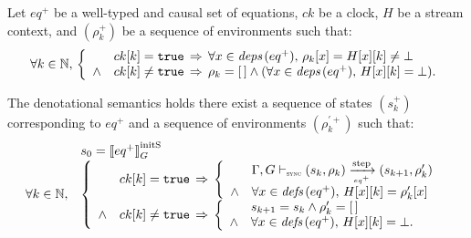 \begin{lemma}
    \label{lem:semantics:grsync:theorems:equivalence:eq}
    Let $eq^+$ be a well-typed and causal set of \GRSync equations, $ck$ be a clock, $H$ be a stream
    context, and $(\rho_k^+)$ be a sequence of environments such that:
    \begin{equation*}
        \forall k \in \mathbb{N}, \,
        \left\{
        \begin{array}{ll}
                   & ck[k] = \mathtt{{true}} \, \Rightarrow \,
            \forall x \in {\ensuremath{\textit{deps}\left(eq^+\right)}}, \, \rho_k[x] = H[x][k] \neq \bot               \\
            \wedge & ck[k] \neq \mathtt{{true}} \, \Rightarrow \,
            \rho_k = [\,] \wedge (\forall x \in {\ensuremath{\textit{deps}\left(eq^+\right)}}, \, H[x][k] = \bot). \\
        \end{array}
        \right.
    \end{equation*}

    The denotational semantics  holds \iff there exist a sequence of states
    $(s_k^+)$ corresponding to $eq^+$ and a sequence of environments $(\rho_k^{\prime+})$ such that:
    \begin{equation*}
        \begin{array}{ll}
                              & s_0 = \initstate{eq^+} \\
            \forall k \in \N, &
            \left\{
            \begin{array}{ll}
                       & ck[k] = \true \, \Rightarrow \,
                \left\{
                \begin{array}{ll}
                           & \eqOpsem{\rho_k}{s_k}{eq^+}{s_{k+1}}{\rho'_k}      \\
                    \wedge & \forall x \in \defs{eq^+}, \, H[x][k] = \rho'_k[x] \\
                \end{array}
                \right.                                     \\
                \wedge & ck[k] \neq \true \, \Rightarrow \,
                \left\{
                \begin{array}{ll}
                           & s_{k+1} = s_k \wedge \rho'_k = \emptyrho       \\
                    \wedge & \forall x \in \defs{eq^+}, \,  H[x][k] = \bot. \\
                \end{array}
                \right.                                     \\
            \end{array}
            \right.
        \end{array}
    \end{equation*}
\end{lemma}
